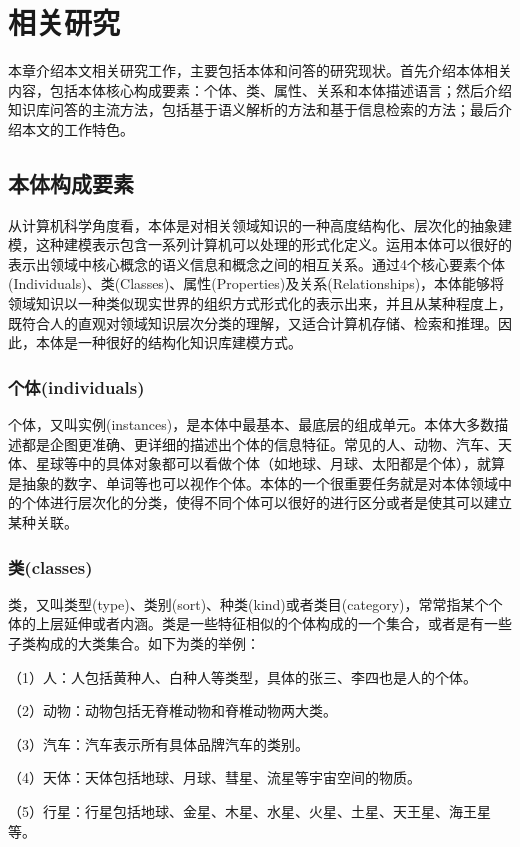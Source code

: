 \chapter{相关研究}
本章介绍本文相关研究工作，主要包括本体和问答的研究现状。首先介绍本体相关内容，包括本体核心构成要素：个体、类、属性、关系和本体描述语言；然后介绍知识库问答的主流方法，包括基于语义解析的方法和基于信息检索的方法；最后介绍本文的工作特色。

\section{本体构成要素}
从计算机科学角度看，本体是对相关领域知识的一种高度结构化、层次化的抽象建模，这种建模表示包含一系列计算机可以处理的形式化定义\cite{Hitzler}。运用本体可以很好的表示出领域中核心概念的语义信息和概念之间的相互关系。通过4个核心要素个体(Individuals)、类(Classes)、属性(Properties)及关系(Relationships)，本体能够将领域知识以一种类似现实世界的组织方式形式化的表示出来，并且从某种程度上，既符合人的直观对领域知识层次分类的理解，又适合计算机存储、检索和推理。因此，本体是一种很好的结构化知识库建模方式。

\subsection{个体(individuals)}
个体，又叫实例(instances)，是本体中最基本、最底层的组成单元。本体大多数描述都是企图更准确、更详细的描述出个体的信息特征。常见的人、动物、汽车、天体、星球等中的具体对象都可以看做个体（如地球、月球、太阳都是个体），就算是抽象的数字、单词等也可以视作个体。本体的一个很重要任务就是对本体领域中的个体进行层次化的分类，使得不同个体可以很好的进行区分或者是使其可以建立某种关联。

\subsection{类(classes)}
类，又叫类型(type)、类别(sort)、种类(kind)或者类目(category)，常常指某个个体的上层延伸或者内涵。类是一些特征相似的个体构成的一个集合，或者是有一些子类构成的大类集合。如下为类的举例：

（1）人：人包括黄种人、白种人等类型，具体的张三、李四也是人的个体。

（2）动物：动物包括无脊椎动物和脊椎动物两大类。

（3）汽车：汽车表示所有具体品牌汽车的类别。

（4）天体：天体包括地球、月球、彗星、流星等宇宙空间的物质。

（5）行星：行星包括地球、金星、木星、水星、火星、土星、天王星、海王星等。

